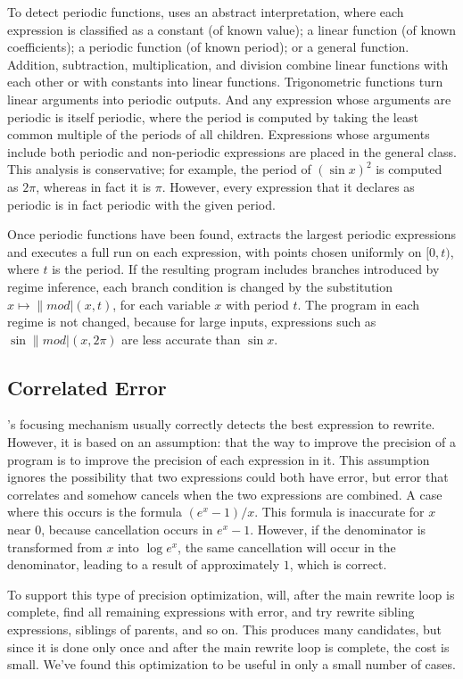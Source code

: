 \documentclass[paper.tex]{subfiles}
\begin{document}
To detect periodic functions, \casio uses an abstract interpretation,
  where each expression is classified as
  a constant (of known value); a linear function (of known coefficients);
  a periodic function (of known period); or a general function.
Addition, subtraction, multiplication, and division
  combine linear functions with each other or with constants
  into linear functions.
Trigonometric functions turn linear arguments
  into periodic outputs.
And any expression whose arguments are periodic
  is itself periodic, where the period is computed
  by taking the least common multiple of the periods of all children.
Expressions whose arguments include
  both periodic and non-periodic expressions
  are placed in the general class.
This analysis is conservative; for example, the period of $(\sin x)^2$
  is computed as $2 \pi$, whereas in fact it is $\pi$.
However, every expression that it declares as periodic
  is in fact periodic with the given period.

Once periodic functions have been found,
  \casio extracts the largest periodic expressions
  and executes a full \casio run on each expression,
  with points chosen uniformly on $[0, t)$,
  where $t$ is the period.
If the resulting program includes branches introduced by regime inference,
  each branch condition is changed by the substitution
  $x \mapsto \|mod|(x, t)$, for each variable $x$ with period $t$.
The program in each regime is not changed,
  because for large inputs, expressions such as
  $\sin \|mod|(x, 2\pi)$
  are less accurate than $\sin x$.

\subsection{Correlated Error}

\casio's focusing mechanism usually correctly detects
  the best expression to rewrite.
However, it is based on an assumption:
  that the way to improve the precision of a program
  is to improve the precision of each expression in it.
This assumption ignores the possibility
  that two expressions could both have error,
  but error that correlates and somehow cancels
  when the two expressions are combined.
A case where this occurs is the formula $(e^x - 1) / x$.
This formula is inaccurate for $x$ near $0$,
  because cancellation occurs in $e^x - 1$.
However, if the denominator is transformed from $x$ into $\log e^x$,
  the same cancellation will occur in the denominator,
  leading to a result of approximately $1$, which is correct.

To support this type of precision optimization,
  \casio will, after the main rewrite loop is complete,
  find all remaining expressions with error,
  and try rewrite sibling expressions, siblings of parents, and so on.
This produces many candidates, but since it is done only once
  and after the main rewrite loop is complete, the cost is small.
We've found this optimization to be useful in only a small number of cases.
\end{document}
